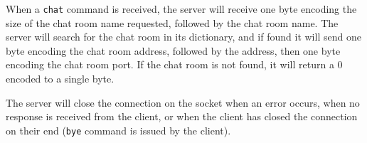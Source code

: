 When a \texttt{chat} command is received, the server will receive one byte encoding the size of the chat room name requested, followed by the chat room name. The server will search for the chat room in its dictionary, and if found it will send one byte encoding the chat room address, followed by the address, then one byte encoding the chat room port. If the chat room is not found, it will return a 0 encoded to a single byte.

The server will close the connection on the socket when an error occurs, when no response is received from the client, or when the client has closed the connection on their end (\texttt{bye} command is issued by the client).
